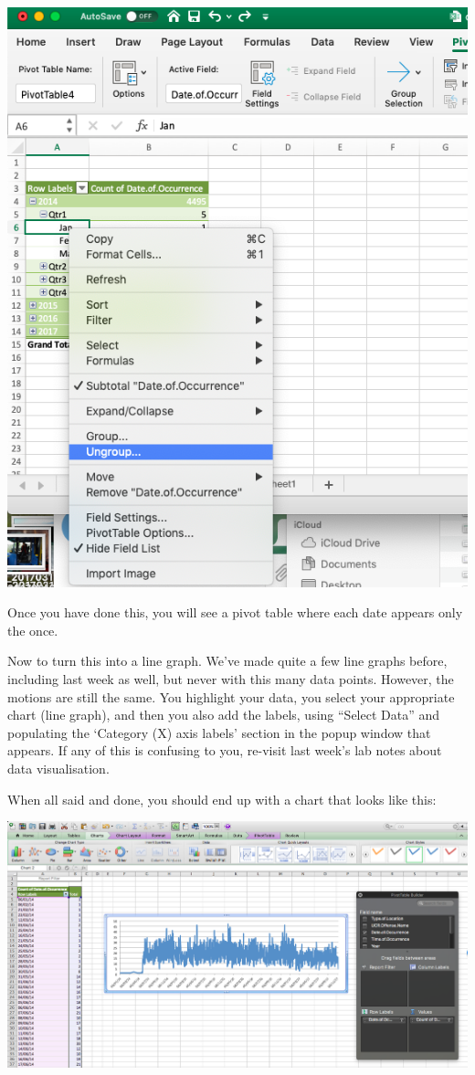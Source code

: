 \documentclass[
]{book}
\begin{document}
\includegraphics{imgs/ex_2016_ungroup.png}

Once you have done this, you will see a pivot table where each date appears only the once.

Now to turn this into a line graph. We've made quite a few line graphs before, including last week as well, but never with this many data points. However, the motions are still the same. You highlight your data, you select your appropriate chart (line graph), and then you also add the labels, using ``Select Data'' and populating the `Category (X) axis labels' section in the popup window that appears. If any of this is confusing to you, re-visit last week's lab notes about data visualisation.

When all said and done, you should end up with a chart that looks like this:

\includegraphics{imgs/line_burgs.png}
\end{document}
